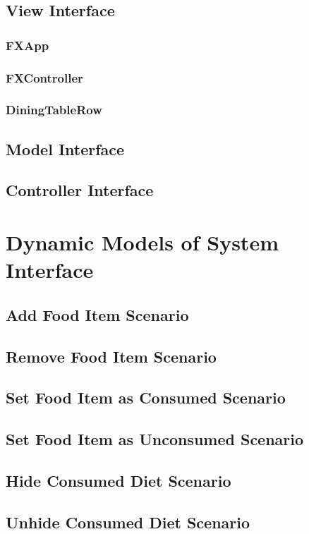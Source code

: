 \documentclass{scrreprt}
\begin{document}
\subsection{View Interface}
\subsubsection{FXApp}
\subsubsection{FXController}
\subsubsection{DiningTableRow}
\subsection{Model Interface}
\subsection{Controller Interface}
\section{Dynamic Models of System Interface}
\subsection{Add Food Item Scenario}
\subsection{Remove Food Item Scenario}
\subsection{Set Food Item as Consumed Scenario}
\subsection{Set Food Item as Unconsumed Scenario}
\subsection{Hide Consumed Diet Scenario}
\subsection{Unhide Consumed Diet Scenario}
\end{document}
